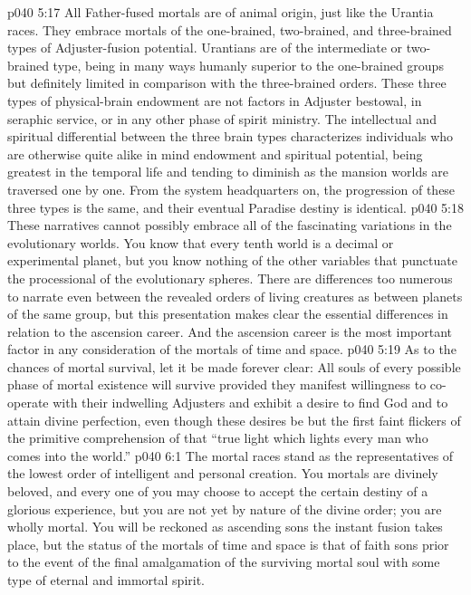 \pc \vs p040 5:17  All Father\hyp{}fused mortals are of animal origin, just like the Urantia races. They embrace mortals of the one\hyp{}brained, two\hyp{}brained, and three\hyp{}brained types of Adjuster\hyp{}fusion potential. Urantians are of the intermediate or two\hyp{}brained type, being in many ways humanly superior to the one\hyp{}brained groups but definitely limited in comparison with the three\hyp{}brained orders. These three types of physical\hyp{}brain endowment are not factors in Adjuster bestowal, in seraphic service, or in any other phase of spirit ministry. The intellectual and spiritual differential between the three brain types characterizes individuals who are otherwise quite alike in mind endowment and spiritual potential, being greatest in the temporal life and tending to diminish as the mansion worlds are traversed one by one. From the system headquarters on, the progression of these three types is the same, and their eventual Paradise destiny is identical.
\pc \vs p040 5:18  These narratives cannot possibly embrace all of the fascinating variations in the evolutionary worlds. You know that every tenth world is a decimal or experimental planet, but you know nothing of the other variables that punctuate the processional of the evolutionary spheres. There are differences too numerous to narrate even between the revealed orders of living creatures as between planets of the same group, but this presentation makes clear the essential differences in relation to the ascension career. And the ascension career is the most important factor in any consideration of the mortals of time and space.
\pc \vs p040 5:19 As to the chances of mortal survival, let it be made forever clear: All souls of every possible phase of mortal existence will survive provided they manifest willingness to co\hyp{}operate with their indwelling Adjusters and exhibit a desire to find God and to attain divine perfection, even though these desires be but the first faint flickers of the primitive comprehension of that “true light which lights every man who comes into the world.”
\vs p040 6:1 The mortal races stand as the representatives of the lowest order of intelligent and personal creation. You mortals are divinely beloved, and every one of you may choose to accept the certain destiny of a glorious experience, but you are not yet by nature of the divine order; you are wholly mortal. You will be reckoned as ascending sons the instant fusion takes place, but the status of the mortals of time and space is that of faith sons prior to the event of the final amalgamation of the surviving mortal soul with some type of eternal and immortal spirit.
